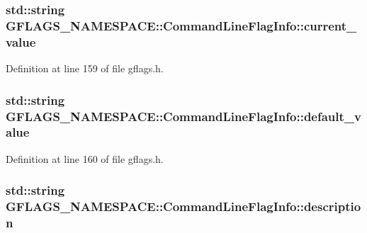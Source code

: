 \subsubsection[{\texorpdfstring{current\+\_\+value}{current_value}}]{\setlength{\rightskip}{0pt plus 5cm}std\+::string G\+F\+L\+A\+G\+S\+\_\+\+N\+A\+M\+E\+S\+P\+A\+C\+E\+::\+Command\+Line\+Flag\+Info\+::current\+\_\+value}\hypertarget{structGFLAGS__NAMESPACE_1_1CommandLineFlagInfo_a654abe3f7f744c9b3772c78bb8a4e90e}{}\label{structGFLAGS__NAMESPACE_1_1CommandLineFlagInfo_a654abe3f7f744c9b3772c78bb8a4e90e}


Definition at line 159 of file gflags.\+h.

\subsubsection[{\texorpdfstring{default\+\_\+value}{default_value}}]{\setlength{\rightskip}{0pt plus 5cm}std\+::string G\+F\+L\+A\+G\+S\+\_\+\+N\+A\+M\+E\+S\+P\+A\+C\+E\+::\+Command\+Line\+Flag\+Info\+::default\+\_\+value}\hypertarget{structGFLAGS__NAMESPACE_1_1CommandLineFlagInfo_a6f786f24cd6eaba82158e785809f53de}{}\label{structGFLAGS__NAMESPACE_1_1CommandLineFlagInfo_a6f786f24cd6eaba82158e785809f53de}


Definition at line 160 of file gflags.\+h.

\subsubsection[{\texorpdfstring{description}{description}}]{\setlength{\rightskip}{0pt plus 5cm}std\+::string G\+F\+L\+A\+G\+S\+\_\+\+N\+A\+M\+E\+S\+P\+A\+C\+E\+::\+Command\+Line\+Flag\+Info\+::description}\hypertarget{structGFLAGS__NAMESPACE_1_1CommandLineFlagInfo_ae8bdcd07b1cb5b0561e122af6955fc90}{}\label{structGFLAGS__NAMESPACE_1_1CommandLineFlagInfo_ae8bdcd07b1cb5b0561e122af6955fc90}


